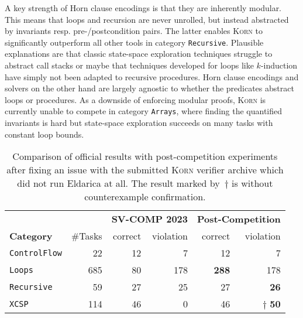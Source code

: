 \documentclass{llncs}
\newcommand{\Korn}{\textsc{Korn}\xspace}
\begin{document}
A key strength of Horn clause encodings is that they are inherently modular.
This means that loops and recursion are never unrolled,
but instead abstracted by invariants resp. pre-/postcondition pairs.
The latter enables \Korn to significantly outperform all other tools in category \texttt{Recursive}.
Plausible explanations are that classic state-space exploration techniques
struggle to abstract call stacks or maybe that techniques developed for loops
like $k$-induction have simply not been adapted to recursive procedures.
Horn clause encodings and solvers on the other hand are largely agnostic
to whether the predicates abstract loops or procedures.
As a downside of enforcing modular proofs,
\Korn is currently unable to compete in category \texttt{Arrays},
where finding the quantified invariants is hard but state-space exploration succeeds
on many tasks with constant loop bounds.

\begin{table}[t]
    \setlength{\tabcolsep}{6pt}
    \centering
    \caption{Comparison of official results
           with post-competition experiments after fixing
           an issue with the submitted \Korn verifier archive
           which did not run Eldarica at all.
           The result marked by~$\dagger$ is without counterexample confirmation. }
    \label{fig:results}
     \begin{tabular}{lrrrrr}
     \toprule
     &&
     \multicolumn{2}{c}{\textbf{SV-COMP 2023}} &
     \multicolumn{2}{c}{\textbf{Post-Competition}}
     \\
     \cmidrule(lr){3-4}
     \cmidrule(l){5-6}
     \multicolumn{1}{l}{\textbf{Category}} &
     \#Tasks &
     correct & violation &
     correct & violation \\
     \cmidrule(r){1-1}
     \cmidrule(lr){2-2}
     \cmidrule(lr){3-3}
     \cmidrule(lr){4-4}
     \cmidrule(lr){5-5}
     \cmidrule(l){6-6}
     \texttt{ControlFlow}   &     22     &    12 &     7 &    12 &     7 \\
     \texttt{Loops}         &    685     &    80 &   178 &\bf288 &   178 \\
     \texttt{Recursive}     &     59     &    27 &    25 &    27 &\bf 26 \\
     \texttt{XCSP}          &    114     &    46 &     0 &    46 &$\dagger$ \bf 50 \\
     \bottomrule
     \end{tabular}
\end{table}
\end{document}
